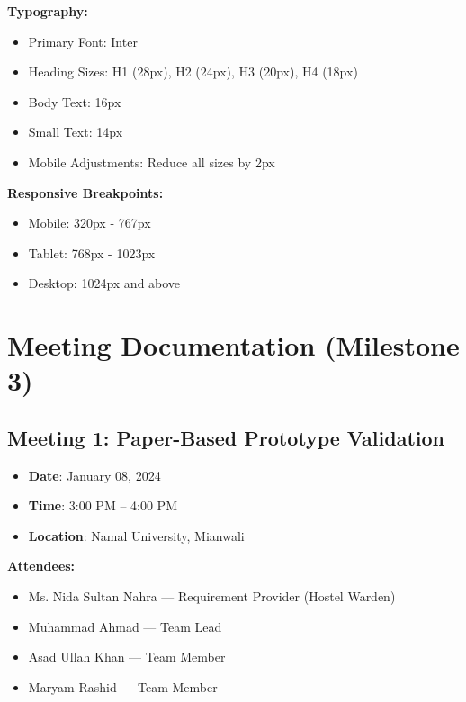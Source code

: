 \documentclass[12pt]{article}
\begin{document}
\textbf{Typography:}

\begin{itemize}
\item Primary Font: Inter
\item Heading Sizes: H1 (28px), H2 (24px), H3 (20px), H4 (18px)
\item Body Text: 16px
\item Small Text: 14px
\item Mobile Adjustments: Reduce all sizes by 2px
\end{itemize}

\textbf{Responsive Breakpoints:}

\begin{itemize}
\item Mobile: 320px - 767px
\item Tablet: 768px - 1023px
\item Desktop: 1024px and above
\end{itemize}

\newpage
\section{Meeting Documentation (Milestone 3)}

\subsection{Meeting 1: Paper-Based Prototype Validation}

\begin{itemize}
\item \textbf{Date}: January 08, 2024  
\item \textbf{Time}: 3:00 PM -- 4:00 PM  
\item \textbf{Location}: Namal University, Mianwali  
\end{itemize}

\textbf{Attendees:}
\begin{itemize}
\item Ms. Nida Sultan Nahra --- Requirement Provider (Hostel Warden)
\item Muhammad Ahmad --- Team Lead
\item Asad Ullah Khan --- Team Member
\item Maryam Rashid --- Team Member
\end{itemize}
\end{document}
